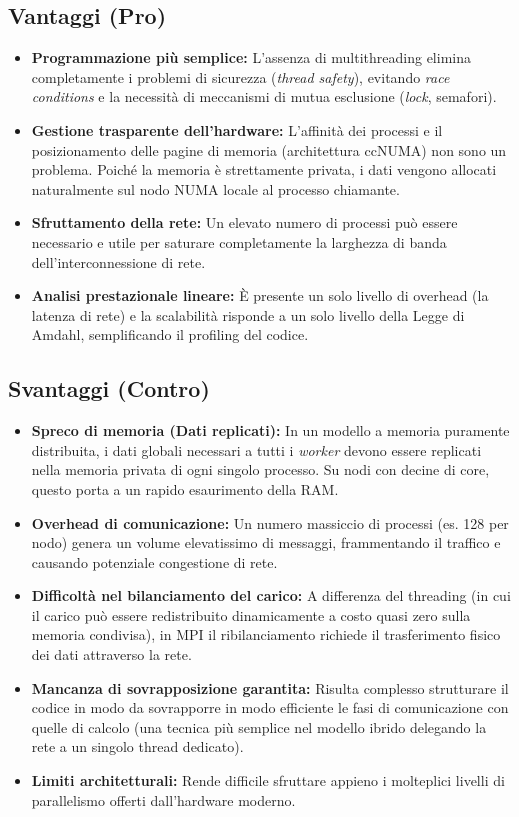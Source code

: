 \subsection*{Vantaggi (Pro)}
\begin{itemize}
    \item \textbf{Programmazione più semplice:} L'assenza di multithreading elimina completamente i problemi di sicurezza (\textit{thread safety}), evitando \textit{race conditions} e la necessità di meccanismi di mutua esclusione (\textit{lock}, semafori).
    \item \textbf{Gestione trasparente dell'hardware:} L'affinità dei processi e il posizionamento delle pagine di memoria (architettura ccNUMA) non sono un problema. Poiché la memoria è strettamente privata, i dati vengono allocati naturalmente sul nodo NUMA locale al processo chiamante.
    \item \textbf{Sfruttamento della rete:} Un elevato numero di processi può essere necessario e utile per saturare completamente la larghezza di banda dell'interconnessione di rete.
    \item \textbf{Analisi prestazionale lineare:} È presente un solo livello di overhead (la latenza di rete) e la scalabilità risponde a un solo livello della Legge di Amdahl, semplificando il profiling del codice.
\end{itemize}

\subsection*{Svantaggi (Contro)}
\begin{itemize}
    \item \textbf{Spreco di memoria (Dati replicati):} In un modello a memoria puramente distribuita, i dati globali necessari a tutti i \textit{worker} devono essere replicati nella memoria privata di ogni singolo processo. Su nodi con decine di core, questo porta a un rapido esaurimento della RAM.
    \item \textbf{Overhead di comunicazione:} Un numero massiccio di processi (es. 128 per nodo) genera un volume elevatissimo di messaggi, frammentando il traffico e causando potenziale congestione di rete.
    \item \textbf{Difficoltà nel bilanciamento del carico:} A differenza del threading (in cui il carico può essere redistribuito dinamicamente a costo quasi zero sulla memoria condivisa), in MPI il ribilanciamento richiede il trasferimento fisico dei dati attraverso la rete.
    \item \textbf{Mancanza di sovrapposizione garantita:} Risulta complesso strutturare il codice in modo da sovrapporre in modo efficiente le fasi di comunicazione con quelle di calcolo (una tecnica più semplice nel modello ibrido delegando la rete a un singolo thread dedicato).
    \item \textbf{Limiti architetturali:} Rende difficile sfruttare appieno i molteplici livelli di parallelismo offerti dall'hardware moderno.
\end{itemize}

